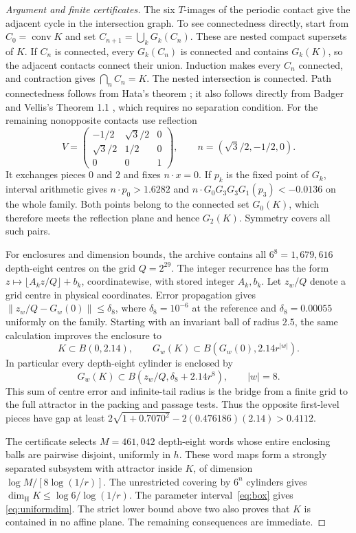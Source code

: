 \documentclass[11pt,a4paper]{article}
\theoremstyle{definition}\newtheorem{definition}[theorem]{Definition}
\theoremstyle{remark}\newtheorem{remark}[theorem]{Remark}
\newcommand{\dimH}{\dim_{\mathrm H}}\newcommand{\dimA}{\dim_{\mathrm A}}
\begin{document}
\begin{proof}[Argument and finite certificates]
The six $T$-images of the periodic contact give the adjacent cycle in the
intersection graph. To see connectedness directly, start from
$C_0=\operatorname{conv}K$ and set $C_{n+1}=\bigcup_kG_k(C_n)$.
These are nested compact supersets of $K$. If $C_n$ is connected, every
$G_k(C_n)$ is connected and contains $G_k(K)$, so the adjacent contacts
connect their union. Induction makes every $C_n$ connected, and contraction
gives $\bigcap_n C_n=K$. The nested intersection is connected.
Path connectedness follows from Hata's theorem \cite{hata}; it also follows
directly from Badger and Vellis's Theorem 1.1 \cite{badgervellis}, which
requires no separation condition. For the remaining nonopposite contacts use reflection
\[
V=\begin{pmatrix}-1/2&\sqrt3/2&0\\\sqrt3/2&1/2&0\\0&0&1\end{pmatrix},
\qquad n=(\sqrt3/2,-1/2,0).
\]
It exchanges pieces $0$ and $2$ and fixes $n\cdot x=0$.
If $p_k$ is the fixed point of $G_k$, interval arithmetic gives
$n\cdot p_0>1.6282$ and
$n\cdot G_0G_3G_3G_1(p_3)<-0.0136$ on the whole family.
Both points belong to the connected set $G_0(K)$, which therefore meets the
reflection plane and hence $G_2(K)$. Symmetry covers all such pairs.

For enclosures and dimension bounds, the archive contains all $6^8=1,679,616$
depth-eight centres on the grid $Q=2^{29}$. The integer recurrence has the form
$z\mapsto\lfloor A_kz/Q\rfloor+b_k$, coordinatewise, with stored integer
$A_k,b_k$. Let $z_w/Q$ denote a grid centre in physical coordinates.
Error propagation gives
$\|z_w/Q-G_w(0)\|\le\delta_8$, where $\delta_8=10^{-6}$ at the reference
and $\delta_8=0.00055$ uniformly on the family. Starting with an invariant ball of radius
$2.5$, the same calculation improves the enclosure to
\begin{equation}\label{eq:tail}
K\subset B(0,2.14),\qquad
G_w(K)\subset B(G_w(0),2.14r^{|w|}).
\end{equation}
In particular every depth-eight cylinder is enclosed by
\begin{equation}\label{eq:gridtail}
G_w(K)\subset B(z_w/Q,\delta_8+2.14r^8),\qquad |w|=8.
\end{equation}
This sum of centre error and infinite-tail radius is the bridge from a
finite grid to the full attractor in the packing and passage tests.
Thus the opposite first-level pieces have gap at least
$2\sqrt{1+0.7070^2}-2(0.476186)(2.14)>0.4112$.

The certificate selects $M=461,042$ depth-eight words whose entire enclosing
balls are pairwise disjoint, uniformly in $h$. These word maps form a strongly
separated subsystem with attractor inside $K$, of dimension
$\log M/[8\log(1/r)]$. The unrestricted covering by $6^n$ cylinders gives
$\dimH K\le\log6/\log(1/r)$. The parameter interval~\eqref{eq:box} gives
\eqref{eq:uniformdim}. The strict lower bound above two also proves that $K$
is contained in no affine plane. The remaining consequences are immediate.
\end{proof}
\end{document}
